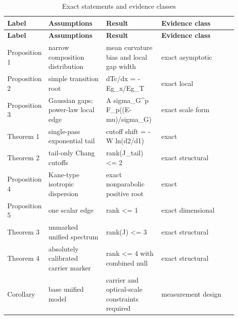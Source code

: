 \documentclass[12pt]{article}
\begin{document}
\begingroup
\scriptsize
\begin{longtable}{@{}p{0.120\linewidth}p{0.250\linewidth}p{0.240\linewidth}p{0.330\linewidth}@{}}
\caption{Exact statements and evidence classes}\\
\toprule
\textbf{Label} & \textbf{Assumptions} & \textbf{Result} & \textbf{Evidence class} \\
\midrule
\endfirsthead
\toprule
\textbf{Label} & \textbf{Assumptions} & \textbf{Result} & \textbf{Evidence class} \\
\midrule
\endhead
Proposition 1 & narrow composition distribution & mean curvature bias and local gap width & exact asymptotic \\
Proposition 2 & simple transition root & dTc/dx = -Eg\_x/Eg\_T & exact local \\
Proposition 3 & Gaussian gaps; power-law local edge & A sigma\_G\textasciicircum{}p F\_p((E-mu)/sigma\_G) & exact scale form \\
Theorem 1 & single-pass exponential tail & cutoff shift = -W ln(d2/d1) & exact \\
Theorem 2 & tail-only Chang cutoffs & rank(J\_tail) <= 2 & exact structural \\
Proposition 4 & Kane-type isotropic dispersion & exact nonparabolic positive root & exact \\
Proposition 5 & one scalar edge & rank <= 1 & exact dimensional \\
Theorem 3 & unmarked unified spectrum & rank(J) <= 3 & exact structural \\
Theorem 4 & absolutely calibrated carrier marker & rank <= 4 with combined null & exact structural \\
Corollary & base unified model & carrier and optical-scale constraints required & measurement design \\
\bottomrule
\end{longtable}
\endgroup
\end{document}
